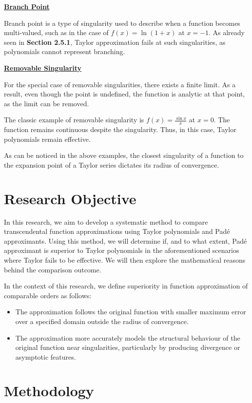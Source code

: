 \documentclass[a4paper, 12pt]{article}
\begin{document}
\underline{\textbf{Branch Point}}

Branch point is a type of singularity used to describe when a function becomes multi-valued, such as in the case of $f(x)=\ln (1+x)$ at $x=-1$. As already seen in \textbf{Section 2.5.1}, Taylor approximation fails at such singularities, as polynomials cannot represent branching.

\underline{\textbf{Removable Singularity}}

For the special case of removable singularities, there exists a finite limit. As a result, even though the point is undefined, the function is analytic at that point, as the limit can be removed.

The classic example of removable singularity is $f(x)=\frac{\sin x}{x}$ at $x=0$. The function remains continuous despite the singularity. Thus, in this case, Taylor polynomials remain effective.

As can be noticed in the above examples, the closest singularity of a function to the expansion point of a Taylor series dictates its radius of convergence.

\section{Research Objective} 
In this research, we aim to develop a systematic method to compare transcendental function approximations using Taylor polynomials and Padé approximants. Using this method, we will determine if, and to what extent, Padé approximant is superior to Taylor polynomials in the aforementioned scenarios where Taylor fails to be effective. We will then explore the mathematical reasons behind the comparison outcome.

In the context of this research, we define superiority in function approximation of comparable orders as follows:

\begin{itemize}
  \item The approximation follows the original function with smaller maximum error over a specified domain outside the radius of convergence.
  \item The approximation more accurately models the structural behaviour of the original function near singularities, particularly by producing divergence or asymptotic features.
\end{itemize}

\section{Methodology} 
\end{document}
